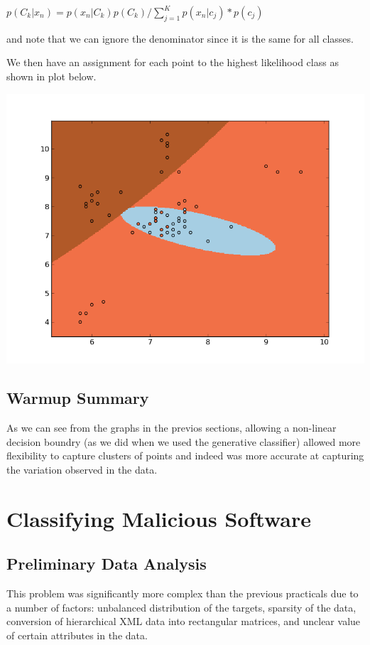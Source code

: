 \documentclass[11pt, oneside]{article}   	%
\begin{document}
$p(C_k |x_n) = p(x_n |C_k)  p(C_k) / \sum\limits_{j=1}^K p(x_n | c_j) * p(c_j)$

and note that we can ignore the denominator since it is the same for all classes.

We then have an assignment for each point to the highest likelihood class as shown in plot below.


\includegraphics[scale=.6]{generative_classifier}


\subsection*{Warmup Summary}

As we can see from the graphs in the previos sections, allowing a non-linear decision boundry (as we did when we used the generative classifier) allowed more flexibility to capture clusters of points and indeed was more accurate at capturing the variation observed in the data.

\section*{Classifying Malicious Software}

\subsection*{Preliminary Data Analysis}

This problem was significantly more complex than the previous practicals due to a number of factors: unbalanced distribution of the targets, sparsity of the data, conversion of hierarchical XML data into rectangular matrices, and unclear value of certain attributes in the data. 
\end{document}
